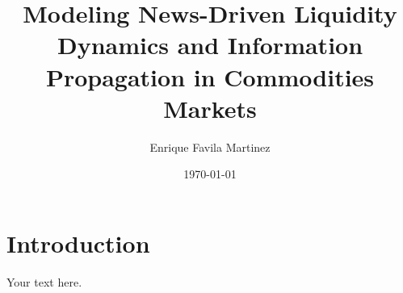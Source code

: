 \documentclass[12pt, a4paper]{report}
\title{\textbf{Modeling News-Driven Liquidity Dynamics and Information
Propagation in Commodities Markets}}
\author{Enrique Favila Martinez}
\date{\today}
\begin{document}
\maketitle
\tableofcontents

\chapter{Introduction}
Your text here.
\end{document}
